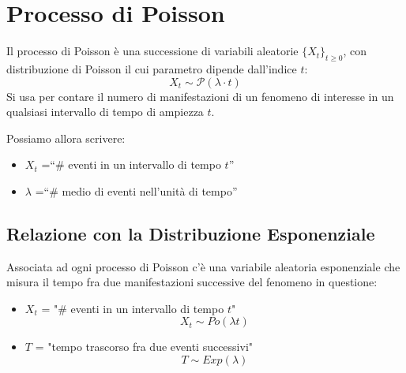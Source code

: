 \section{Processo di Poisson}
\begin{tcolorbox}
Il processo di Poisson è una successione di variabili aleatorie \(\{X_t\}_{t \geq 0}\), con distribuzione di Poisson il cui parametro dipende dall’indice \(t\):
\[X_t \sim \mathcal{P}(\lambda \cdot t)\]
Si usa per contare il numero di manifestazioni di un fenomeno di interesse in un qualsiasi intervallo di tempo di ampiezza \(t\).
\end{tcolorbox}
Possiamo allora scrivere:
\begin{itemize}
    \item \(X_t\) =“\# eventi in un intervallo di tempo \(t\)”
    \item \(\lambda\) =“\# medio di eventi nell’unità di tempo”
\end{itemize}

\subsection{Relazione con la Distribuzione Esponenziale}
Associata ad ogni processo di Poisson c’è una variabile aleatoria esponenziale che misura il tempo fra due manifestazioni successive del fenomeno in questione:
\begin{itemize}
    \item \(X_t\) = "\# eventi in un intervallo di tempo \(t\)"
    \[X_t \sim Po(\lambda t)\]
    \item \(T\) = "tempo trascorso fra due eventi successivi"
    \[T \sim Exp(\lambda)\]
\end{itemize}
